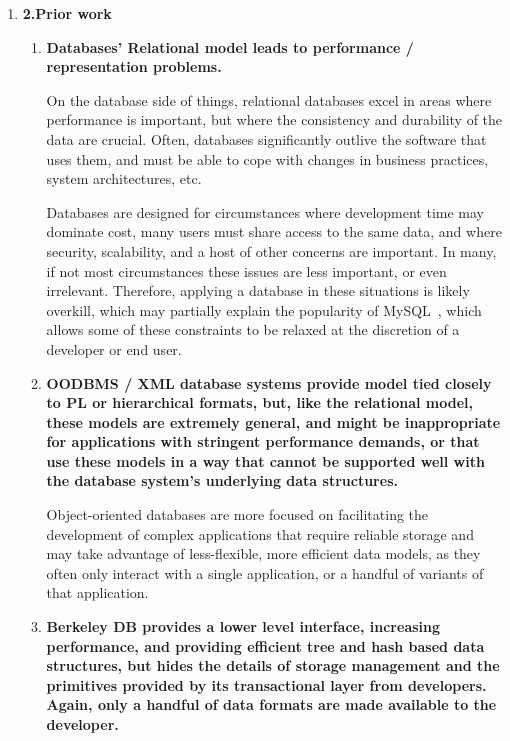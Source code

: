 \documentclass[letterpaper,english]{article}
\begin{document}
\begin{enumerate}
\begin{enumerate}
\end{enumerate}
\item {\bf 2.Prior work}

\begin{enumerate}

  \item{\bf Databases' Relational model leads to performance /
  representation problems.}

On the database side of things, relational databases excel in areas
where performance is important, but where the consistency and
durability of the data are crucial.  Often, databases significantly
outlive the software that uses them, and must be able to cope with
changes in business practices, system architectures,
etc.~\cite{relational}

Databases are designed for circumstances where development time may
dominate cost, many users must share access to the same data, and
where security, scalability, and a host of other concerns are
important.  In many, if not most circumstances these issues are less
important, or even irrelevant.  Therefore, applying a database in
these situations is likely overkill, which may partially explain the
popularity of MySQL~\cite{mysql}, which allows some of these
constraints to be relaxed at the discretion of a developer or end
user.

  \item{\bf OODBMS / XML database systems provide model tied closely to PL
  or hierarchical formats, but, like the relational model, these
  models are extremely general, and might be inappropriate for
  applications with stringent performance demands, or that use these
  models in a way that cannot be supported well with the database
  system's underlying data structures.}

Object-oriented databases are more focused on facilitating the
development of complex applications that require reliable storage and
may take advantage of less-flexible, more efficient data models, as
they often only interact with a single application, or a handful of
variants of that application.~\cite{lamb}

  \item{\bf Berkeley DB provides a lower level interface, increasing
  performance, and providing efficient tree and hash based data
  structures, but hides the details of storage management and the
  primitives provided by its transactional layer from
  developers. Again, only a handful of data formats are made available
  to the developer.}


\end{enumerate}
\end{enumerate}
\end{document}
